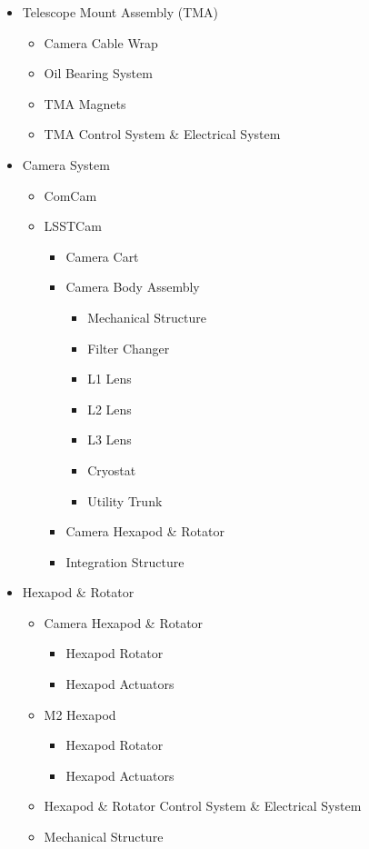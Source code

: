 \begin{small}
\begin{itemize}
	\item Telescope Mount Assembly (TMA)
	\begin{itemize}
		\item Camera Cable Wrap
		\item Oil Bearing System
		\item TMA Magnets
		\item TMA Control System \& Electrical System
	\end{itemize}

	\item Camera System
	\begin{itemize}
		\item ComCam
		\item LSSTCam
			\begin{itemize}
			\item Camera Cart
			\item Camera Body Assembly
				\begin{itemize}
				\item Mechanical Structure
				\item Filter Changer
				\item L1 Lens
				\item L2 Lens
				\item L3 Lens
				\item Cryostat
				\item Utility Trunk
				\end{itemize}
			\item Camera Hexapod \& Rotator
			\item Integration Structure
			\end{itemize}
	\end{itemize}

	\item Hexapod \& Rotator
	\begin{itemize}
		\item Camera Hexapod \& Rotator
			\begin{itemize}
			\item Hexapod Rotator
			\item Hexapod Actuators
			\end{itemize}
		\item M2 Hexapod
			\begin{itemize}
			\item Hexapod Rotator
			\item Hexapod Actuators
			\end{itemize}
		\item Hexapod \& Rotator Control System \& Electrical System
		\item Mechanical Structure
	\end{itemize}


\end{itemize}
\end{small}
